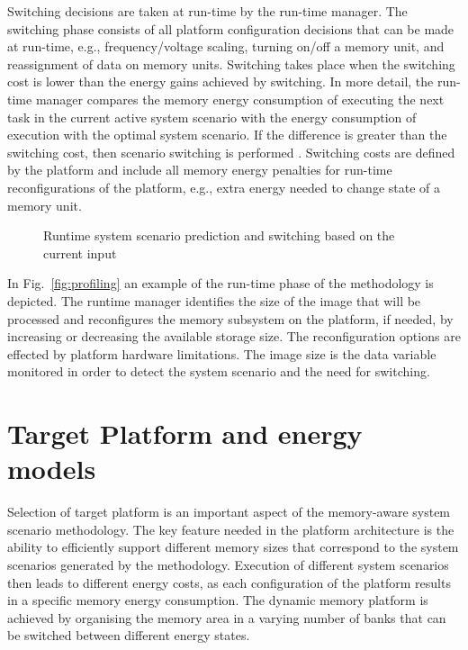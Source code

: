 \documentclass{acm_proc_article-sp}
\begin{document}
Switching decisions are taken at run-time by the run-time manager. The switching phase consists of all platform configuration decisions that can be made at run-time, e.g., frequency/voltage scaling, turning on/off a memory unit, and reassignment of data on memory units. Switching takes place when the switching cost is lower than the energy gains achieved by switching. In more detail, the run-time manager compares the memory energy consumption of executing the next task in the current active system scenario with the energy consumption of execution with the optimal system scenario. If the difference is greater than the switching cost, then scenario switching is performed \cite{tcm}. Switching costs are defined by the platform and include all memory energy penalties for run-time reconfigurations of the platform, e.g., extra energy needed to change state of a memory unit.

\begin{figure}[!t]
\centering
\caption{Runtime system scenario prediction and switching based on the current input}
\label{fig:runtime}
\end{figure}

In Fig.~\ref{fig:profiling} an example of the run-time phase of the methodology is depicted. The runtime manager identifies the size of the image that will be processed and reconfigures the memory subsystem on the platform, if needed, by increasing or decreasing the available storage size. The reconfiguration options are effected by platform hardware limitations. The image size is the data variable monitored in order to detect the system scenario and the need for switching.

\section{Target Platform and energy \\ models}
\label{sec:platform}

Selection of target platform is an important aspect of the memory-aware system scenario methodology. The key feature needed in the platform architecture is the ability to efficiently support different memory sizes that correspond to the system scenarios generated by the methodology. Execution of different system scenarios then leads to different energy costs, as each configuration of the platform results in a specific memory energy consumption. The dynamic memory platform is achieved by organising the memory area in a varying number of banks that can be switched between different energy states. 
\end{document}
